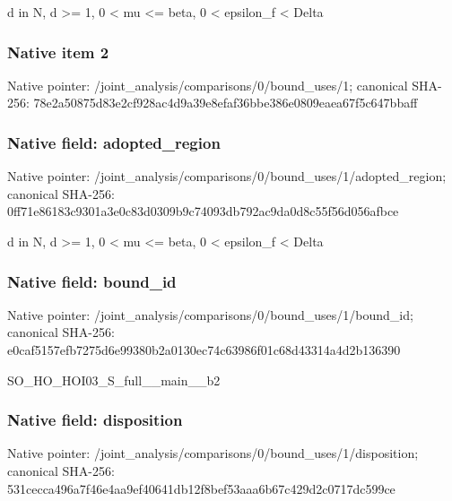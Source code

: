 \documentclass[10pt,a4paper]{article}
\begin{document}
\begingroup\raggedright\sloppy d in N,\allowbreak{} d >=\allowbreak{} 1,\allowbreak{} 0 < mu <=\allowbreak{} beta,\allowbreak{} 0 < epsilon\_\allowbreak{}f < Delta\par\endgroup

\subsubsection{Native item 2}
Native pointer: /joint\_\allowbreak{}analysis/comparisons/0/bound\_\allowbreak{}uses/1; canonical SHA-256: 78e2a50875d83e2cf928ac4d9a39e8efaf36bbe386e0809eaea67f5c647bbaff

\subsubsection{Native field: adopted\_\allowbreak{}region}
Native pointer: /joint\_\allowbreak{}analysis/comparisons/0/bound\_\allowbreak{}uses/1/adopted\_\allowbreak{}region; canonical SHA-256: 0ff71e86183c9301a3e0c83d0309b9c74093db792ac9da0d8c55f56d056afbce

\begingroup\raggedright\sloppy d in N,\allowbreak{} d >=\allowbreak{} 1,\allowbreak{} 0 < mu <=\allowbreak{} beta,\allowbreak{} 0 < epsilon\_\allowbreak{}f < Delta\par\endgroup

\subsubsection{Native field: bound\_\allowbreak{}id}
Native pointer: /joint\_\allowbreak{}analysis/comparisons/0/bound\_\allowbreak{}uses/1/bound\_\allowbreak{}id; canonical SHA-256: e0caf5157efb7275d6e99380b2a0130ec74c63986f01c68d43314a4d2b136390

\begingroup\raggedright\sloppy SO\_\allowbreak{}HO\_\allowbreak{}HOI03\_\allowbreak{}S\_\allowbreak{}full\_\allowbreak{}\_\allowbreak{}main\_\allowbreak{}\_\allowbreak{}b2\par\endgroup

\subsubsection{Native field: disposition}
Native pointer: /joint\_\allowbreak{}analysis/comparisons/0/bound\_\allowbreak{}uses/1/disposition; canonical SHA-256: 531cecca496a7f46e4aa9ef40641db12f8bef53aaa6b67c429d2c0717dc599ce
\end{document}
